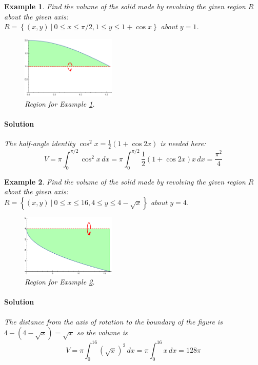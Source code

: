 \documentclass[letterpaper, 11pt, openany]{book}
\theoremstyle{mytheoremstyle}
\theoremstyle{myexamplestyle}
\newtheorem{example}{Example}[section]
\newenvironment{solution}{\paragraph{\sffamily \smaller \fontseries{b}\selectfont Solution}}{\hfill\faSquare}
\begin{document}
\begin{example}
    \label{e:volcstrigshift} Find the volume of the solid made by revolving the given region $R$ about the given axis: \\$R = \left\{ (x,y) \ | \ 0 \leq x \leq \pi/2, 1 \leq y \leq 1 + \cos x \right\}$ about $y = 1$.
    
    \begin{figure}[htbp]
        \centering
            \includegraphics[width=0.4\textwidth]{Figures/volcstrigshift.pdf}
        \caption{Region for Example \ref{e:volcstrigshift}.}
        \label{f:volcstrigshift}
    \end{figure}

    \begin{solution}
        The half-angle identity $\cos^{2} x = \frac{1}{2}\left( 1 + \cos 2x \right)$ is needed here:
        \[V = \pi \int_{0}^{\pi/2} \cos^{2} x \, dx = \pi \int_{0}^{\pi/2} \frac{1}{2}\left( 1 + \cos 2x \right) x \, dx = \frac{\pi^{2}}{4}\]
    \end{solution}
\end{example}

\begin{example}
    \label{e:vol-disk-sqrt} Find the volume of the solid made by revolving the given region $R$ about the given axis: \\$R = \left\{ (x,y) \ | \ 0 \leq x \leq 16, 4 \leq y \leq 4 - \sqrt{x}  \right\}$ about $y = 4$.

    \begin{figure}[htbp]
        \centering
            \includegraphics[width=0.4\textwidth]{Figures/vol-Disc-SQrt.pdf}
        \caption{Region for Example \ref{e:vol-disk-sqrt}.}
        \label{f:vol-disk-sqrt}
    \end{figure}

    \begin{solution}
        The distance from the axis of rotation to the boundary of the figure is \(4 - (4 - \sqrt{x}) = \sqrt{x}\) \faSmile \; so the volume is
        \[ V = \pi \int_{0}^{16} (\sqrt{x})^{2} \, dx = \pi \int_{0}^{16} x \, dx = 128\pi \]

    \end{solution}

\end{example}
\end{document}
